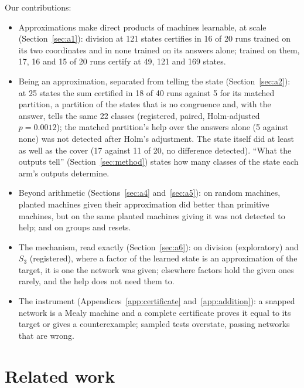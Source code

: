 \documentclass[11pt]{article}
\newcommand{\pn}[2]{#2}
\begin{document}
Our contributions:
\begin{itemize}
\item Approximations make direct products of machines learnable, at scale (Section~\ref{sec:a1}): division at
  121 states certifies in \pn{k4.cover}{16} of 20 runs trained on its two coordinates and in
  \pn{k4.quotient}{none} trained on its answers alone; trained on them, \pn{k6.rates}{17, 16 and 15}
  of 20 runs certify at 49, 121 and 169 states.
\item Being an approximation, separated from telling the state (Section~\ref{sec:a2}): at 25 states
  the sum certified in \pn{told1.d5-sum}{18} of 40 runs against \pn{told1.d5-matched}{5} for its
  matched partition, a partition of the states that is no congruence and, with the answer, tells the
  same 22 classes (registered, paired, Holm-adjusted $p = \pn{told1.congruence-holm}{0.0012}$); the
  matched partition's help over the answers alone (\pn{told1.d5-matched}{5} against
  \pn{told1.d5-quotient}{none}) was not detected after Holm's adjustment. The state itself did at least as well as
  the cover (\pn{t12.state}{17} against \pn{t12.cover}{11} of 20, no difference detected).
  ``What the outputs tell'' (Section~\ref{sec:method}) states how many classes of the state each
  arm's outputs determine.
\item Beyond arithmetic (Sections~\ref{sec:a4} and~\ref{sec:a5}): on random machines, planted
  machines given their approximation did better than primitive machines, but on the same planted
  machines giving it was not detected to help; and on groups and resets.
\item The mechanism, read exactly (Section~\ref{sec:a6}): on division (exploratory) and $S_3$ (registered), where a factor of the learned state is an
  approximation of the target, it is one the network was given; elsewhere factors hold the given
  ones rarely, and the help does not need them to.
\item The instrument (Appendices~\ref{app:certificate} and~\ref{app:addition}): a snapped network is a
  Mealy machine and a complete certificate proves it equal to its target or gives a counterexample;
  sampled tests overstate, passing networks that are wrong.
\end{itemize}

\section{Related work}
\label{sec:related}
\end{document}
